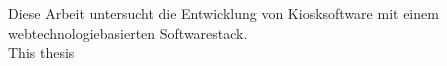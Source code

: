 \chapter{\abstractname}

Diese Arbeit untersucht die Entwicklung von Kiosksoftware mit einem 
webtechnologiebasierten Softwarestack.\\

This thesis

